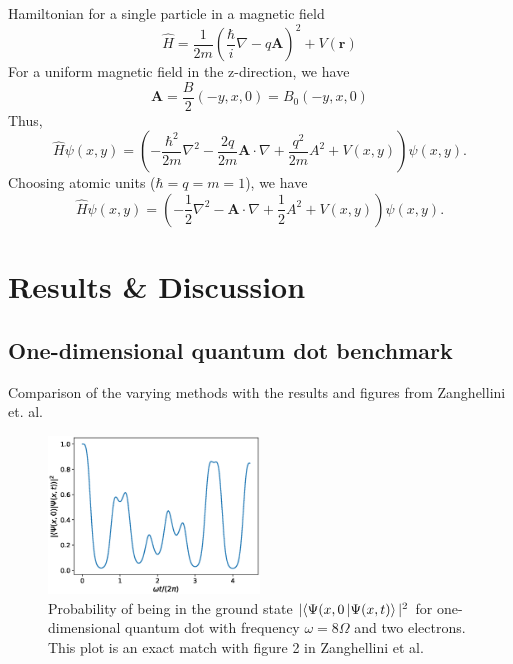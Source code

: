 \documentclass[aip,jcp,reprint,floatfix]{revtex4-1}
\renewcommand{\vec}[1]{\boldsymbol{#1}}
\begin{document}
        Hamiltonian for a single particle in a magnetic field \cite{TimeDomainTwoElectronsQuantumDot}
\begin{equation}
    \hat{H} = \frac{1}{2m} \left( \frac{\hbar}{i} \nabla - q \vec{A} \right)^2 + V(\vec{r})
\end{equation}
For a uniform magnetic field in the z-direction, we have 
\begin{equation}
    \vec{A} = \frac{B}{2} (-y,x,0) = B_0 (-y,x,0)
\end{equation}
Thus, 
\begin{equation}
    \hat{H} \psi(x,y) = \left(-\frac{\hbar^2}{2m} \nabla^2  - \frac{2q}{2m}\vec{A} \cdot \nabla  + \frac{q^2}{2m} A^2 + V(x,y) \right) \psi(x,y).
\end{equation}
Choosing atomic units ($\hbar = q = m = 1$), we have
\begin{equation}
    \hat{H} \psi(x,y) = \left(-\frac{1}{2} \nabla^2  -\vec{A} \cdot \nabla  + \frac{1}{2}A^2 + V(x,y) \right) \psi(x,y).
\end{equation}

\section{Results \& Discussion}

    \subsection{One-dimensional quantum dot benchmark}
        Comparison of the varying methods with the results and figures from Zanghellini et. al\cite{Zanghellini04}.
        
        \begin{figure}
        \includegraphics[width=0.5\textwidth]{./figures/zanghellini_fig2.eps}
        \caption{\label{fig:1DZanghellini} Probability of being in the ground state
        $|\langle\Psi(x,0\ket{\Psi(x,t)}|^2$ for one-dimensional quantum dot with frequency
        $\omega = 8\Omega$ and two electrons. This plot is an exact match with figure 2 in Zanghellini
        et al.\cite{Zanghellini04}
        }
        \end{figure}
\end{document}
